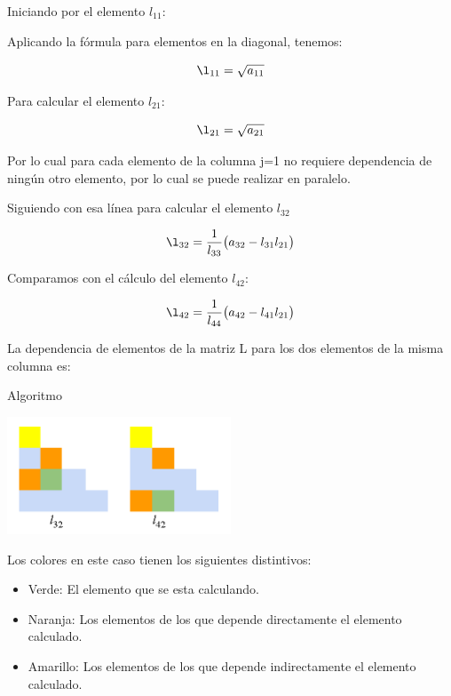 \documentclass{beamer}
\begin{document}
\begin{frame}
Iniciando por el elemento $l_{11}$:

Aplicando la fórmula para elementos en la diagonal, tenemos:

\begin{equation}
\l_{11} = \sqrt{a_{11}}
\end{equation}

Para calcular el elemento $l_{21}$:

\begin{equation}
\l_{21} = \sqrt{a_{21}}
\end{equation}

Por lo cual para cada elemento de la columna j=1 no requiere dependencia de ningún otro elemento, por lo cual se puede realizar en paralelo.

\end{frame}

\begin{frame}
Siguiendo con esa línea para calcular el elemento $l_{32}$

\begin{equation}
\l_{32} = \frac{1}{l_{33}} \big( a_{32} - {l_{31}l_{21}}\big)
\end{equation}

Comparamos con el cálculo del elemento  $l_{42}$:

\begin{equation}
\l_{42} = \frac{1}{l_{44}} \big( a_{42} - {l_{41}l_{21}}\big)
\end{equation}

La dependencia de elementos de la matriz L para los dos elementos de la misma columna es:
\end{frame}

\begin{frame}{Algoritmo}
\begin{center}
	\includegraphics[width=0.5\textwidth]{MatrixGreen}
\end{center}


Los colores en este caso tienen los siguientes distintivos:

\begin{itemize}
\item Verde: El elemento que se esta calculando.
\end{itemize}

\begin{itemize}
\item Naranja: Los elementos de los que depende directamente el elemento calculado.
\end{itemize}

\begin{itemize}
\item Amarillo: Los elementos de los que depende indirectamente el elemento calculado.
\end{itemize}
\end{frame}
\end{document}
